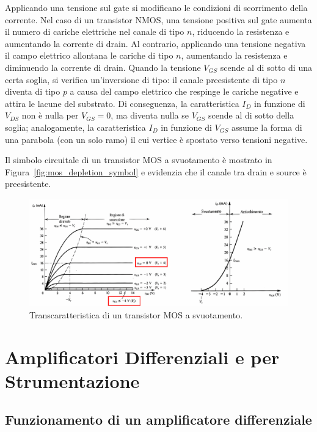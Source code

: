 Applicando una tensione sul gate si modificano le condizioni di scorrimento della corrente. Nel caso di un transistor NMOS, una tensione positiva sul gate aumenta il numero di cariche elettriche nel canale di tipo \(n\), riducendo la resistenza e aumentando la corrente di drain. Al contrario, applicando una tensione negativa il campo elettrico allontana le cariche di tipo \(n\), aumentando la resistenza e diminuendo la corrente di drain. Quando la tensione \(V_{GS}\) scende al di sotto di una certa soglia, si verifica un’inversione di tipo: il canale preesistente di tipo \(n\) diventa di tipo \(p\) a causa del campo elettrico che respinge le cariche negative e attira le lacune del substrato. Di conseguenza, la caratteristica \(I_D\) in funzione di \(V_{DS}\) non è nulla per \(V_{GS}=0\), ma diventa nulla se \(V_{GS}\) scende al di sotto della soglia; analogamente, la caratteristica \(I_D\) in funzione di \(V_{GS}\) assume la forma di una parabola (con un solo ramo) il cui vertice è spostato verso tensioni negative.

Il simbolo circuitale di un transistor MOS a svuotamento è mostrato in Figura~\ref{fig:mos_depletion_symbol} e evidenzia che il canale tra drain e source è preesistente.

\begin{figure}[H]
  \centering
  \includegraphics[width=1\textwidth]{images/1.4.2.1.png}
  \caption{Transcaratteristica di un transistor MOS a svuotamento.}
  \label{fig:transc_svuot}
\end{figure}
\newpage
\section{Amplificatori Differenziali e per Strumentazione}

\subsection{Funzionamento di un amplificatore differenziale}

